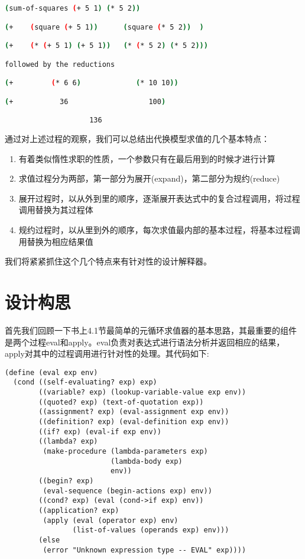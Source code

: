 \documentclass{article}
\begin{document}
\begin{CJK*}{UTF8}{gkai}
\begin{lstlisting}[language=bash, numbers=none, basicstyle=\footnotesize\color{green}\ttfamily\bfseries, backgroundcolor=\color{black}]
(sum-of-squares (+ 5 1) (* 5 2))

(+    (square (+ 5 1))      (square (* 5 2))  )

(+    (* (+ 5 1) (+ 5 1))   (* (* 5 2) (* 5 2)))

followed by the reductions

(+         (* 6 6)             (* 10 10))

(+           36                   100)

                    136
\end{lstlisting}

通过对上述过程的观察，我们可以总结出代换模型求值的几个基本特点：

\begin{enumerate}
	\item 有着类似惰性求职的性质，一个参数只有在最后用到的时候才进行计算
	\item 求值过程分为两部，第一部分为展开(expand)，第二部分为规约(reduce)
	\item 展开过程时，以从外到里的顺序，逐渐展开表达式中的复合过程调用，将过程调用替换为其过程体
	\item 规约过程时，以从里到外的顺序，每次求值最内部的基本过程，将基本过程调用替换为相应结果值
\end{enumerate}

我们将紧紧抓住这个几个特点来有针对性的设计解释器。

\section{设计构思}

首先我们回顾一下书上4.1节最简单的元循环求值器的基本思路，其最重要的组件是两个过程eval和apply。eval负责对表达式进行语法分析并返回相应的结果，apply对其中的过程调用进行针对性的处理。其代码如下:

\begin{lstlisting}
(define (eval exp env)
  (cond ((self-evaluating? exp) exp)
        ((variable? exp) (lookup-variable-value exp env))
        ((quoted? exp) (text-of-quotation exp))
        ((assignment? exp) (eval-assignment exp env))
        ((definition? exp) (eval-definition exp env))
        ((if? exp) (eval-if exp env))
        ((lambda? exp)
         (make-procedure (lambda-parameters exp)
                         (lambda-body exp)
                         env))
        ((begin? exp) 
         (eval-sequence (begin-actions exp) env))
        ((cond? exp) (eval (cond->if exp) env))
        ((application? exp)
         (apply (eval (operator exp) env)
                (list-of-values (operands exp) env)))
        (else
         (error "Unknown expression type -- EVAL" exp))))



\end{lstlisting}
\end{CJK*}
\end{document}
